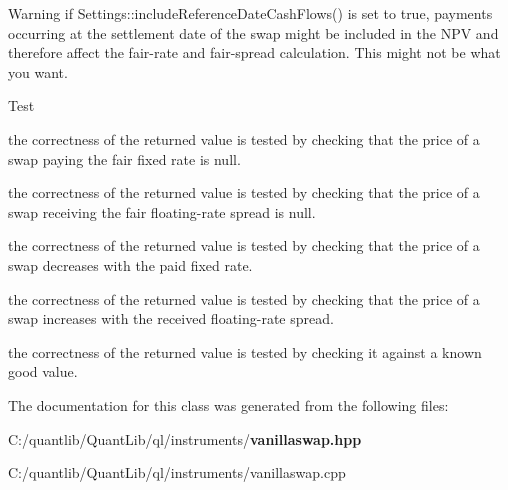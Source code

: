 \begin{DoxyWarning}{Warning}
if {\ttfamily Settings\+::include\+Reference\+Date\+Cash\+Flows()} is set to {\ttfamily true}, payments occurring at the settlement date of the swap might be included in the N\+PV and therefore affect the fair-\/rate and fair-\/spread calculation. This might not be what you want.
\end{DoxyWarning}
\begin{DoxyRefDesc}{Test}
\item[{\bf Test}]
\begin{DoxyItemize}
\item the correctness of the returned value is tested by checking that the price of a swap paying the fair fixed rate is null.
\item the correctness of the returned value is tested by checking that the price of a swap receiving the fair floating-\/rate spread is null.
\item the correctness of the returned value is tested by checking that the price of a swap decreases with the paid fixed rate.
\item the correctness of the returned value is tested by checking that the price of a swap increases with the received floating-\/rate spread.
\item the correctness of the returned value is tested by checking it against a known good value. 
\end{DoxyItemize}\end{DoxyRefDesc}


The documentation for this class was generated from the following files\+:\begin{DoxyCompactItemize}
\item 
C\+:/quantlib/\+Quant\+Lib/ql/instruments/{\bf vanillaswap.\+hpp}\item 
C\+:/quantlib/\+Quant\+Lib/ql/instruments/vanillaswap.\+cpp\end{DoxyCompactItemize}
